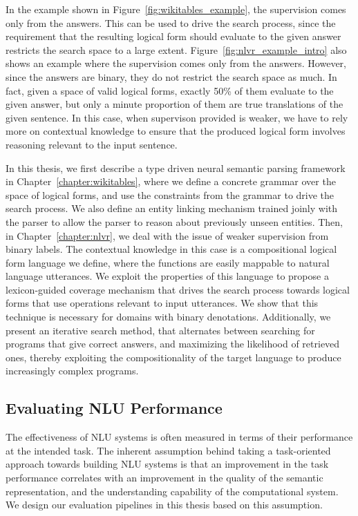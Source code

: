 In the example shown in Figure~\ref{fig:wikitables_example}, the supervision comes only from the
answers. This can be used to drive the search process, since the requirement that the resulting
logical form should evaluate to the given answer restricts the search space to a large extent.
Figure~\ref{fig:nlvr_example_intro} also shows an example where the supervision comes only from the
answers. However, since the answers are binary, they do not restrict the search space as much. In
fact, given a space of valid logical forms, exactly 50\% of them evaluate to the given answer, but
only a minute proportion of them are true translations of the given sentence. In this case, when
supervison provided is weaker, we have to rely more on contextual knowledge to ensure that the
produced logical form involves reasoning relevant to the input sentence.

In this thesis, we first describe a type driven neural semantic parsing framework in
Chapter~\ref{chapter:wikitables}, where we define a concrete grammar over the space of logical
forms, and use the constraints from the grammar to drive the search process. We also define an
entity linking mechanism trained joinly with the parser to allow the parser to reason about
previously unseen entities. Then, in Chapter~\ref{chapter:nlvr}, we deal with the issue of weaker
supervision from binary labels. The contextual knowledge in this case is a compositional logical
form language we define, where the functions are easily mappable to natural language utterances. We
exploit the properties of this language to propose a lexicon-guided coverage mechanism that drives
the search process towards logical forms that use operations relevant to input utterances.  We show
that this technique is necessary for domains with binary denotations. Additionally, we present an
iterative search method, that alternates between searching for programs that give correct answers,
and maximizing the likelihood of retrieved ones, thereby exploiting the compositionality of the
target language to produce increasingly complex programs. 

\subsection{Evaluating NLU Performance} The effectiveness of NLU systems is often measured in terms
of their performance at the intended task. The inherent assumption behind taking a task-oriented
approach towards building NLU systems is that an improvement in the task performance correlates with
an improvement in the quality of the semantic representation, and the understanding capability of
the computational system.  We design our evaluation pipelines in this thesis based on this
assumption.

